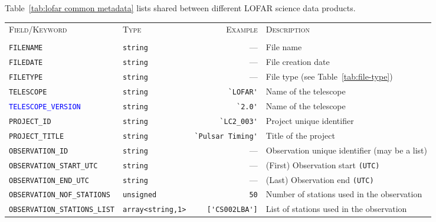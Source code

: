 \documentclass[a4paper,10pt,bibtotoc]{scrartcl}
\begin{document}
\subsubsection{\cla}
\label{sec:common lofar attributes}

Table~\ref{tab:lofar common metadata} lists \cla shared between different LOFAR science data products.


\vspace{-5mm}
\begin{table}[htbp]
  \centering
  \begin{tabular}{|lp{1.5cm}rp{5cm}|}
    \hline
    \textsc{Field/Keyword} & \textsc{Type} & \textsc{Example} & \textsc{Description} \\
     &  &   & \\
    \hline \hline
    \small \verb|FILENAME| & \small\verb|string| & ---  &  File name \\
    \small \verb|FILEDATE| & \small\verb|string| & ---  &  File creation date \\
    \small \verb|FILETYPE| & \small\verb|string| & ---  &  File type (see Table~\ref{tab:file-type}) \\
    \small \verb|TELESCOPE| & \small\verb|string| & \verb|`LOFAR'|  &  Name of the telescope \\
    \small \textcolor{blue}{\texttt{TELESCOPE\_VERSION}} & \small\verb|string| & \verb|`2.0'|  &  Name of the telescope \\
    \small \verb|PROJECT_ID| & \small\verb|string| & \verb|`LC2_003'|  &  Project unique identifier \\
    \small \verb|PROJECT_TITLE| & \small\verb|string| & \verb|`Pulsar Timing'|  &  Title of the project \\
    \small \verb|OBSERVATION_ID| & \small\verb|string| & ---  &  Observation unique identifier (may be a list) \\
    \small \verb|OBSERVATION_START_UTC| & \small\verb|string|& ---  &  (First) Observation start \verb|(UTC)| \\
    \small \verb|OBSERVATION_END_UTC| & \small\verb|string| & ---  &  (Last) Observation end \verb|(UTC)| \\
    \small \verb|OBSERVATION_NOF_STATIONS|  & \small\verb|unsigned| & \verb|50|  &  Number of stations used in the observation \\
    \small \verb|OBSERVATION_STATIONS_LIST| & \small\verb|array<string,1>| & \verb|['CS002LBA']|  &  List of stations used in the observation \\

\end{tabular}
\end{table}
\end{document}
